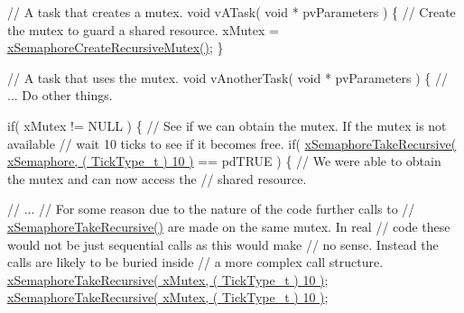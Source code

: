 \begin{DoxyPre}// A task that creates a mutex.
void vATask( void * pvParameters )
\{
   // Create the mutex to guard a shared resource.
   xMutex = \hyperlink{vendor_2ceedling_2plugins_2freertos_2src_2freertos_2include_2semphr_8h_a1bbc843be5a41ea83d2693b2189fc0f8}{xSemaphoreCreateRecursiveMutex()};
\}\end{DoxyPre}



\begin{DoxyPre}// A task that uses the mutex.
void vAnotherTask( void * pvParameters )
\{
   // ... Do other things.\end{DoxyPre}



\begin{DoxyPre}   if( xMutex != NULL )
   \{
       // See if we can obtain the mutex.  If the mutex is not available
       // wait 10 ticks to see if it becomes free.
       if( \hyperlink{vendor_2ceedling_2plugins_2freertos_2src_2freertos_2include_2semphr_8h_ad395f4bba51eea6af3397d72bc079e4d}{xSemaphoreTakeRecursive( xSemaphore, ( TickType\_t ) 10 )} == pdTRUE )
       \{
           // We were able to obtain the mutex and can now access the
           // shared resource.\end{DoxyPre}



\begin{DoxyPre}           // ...
           // For some reason due to the nature of the code further calls to
        // \hyperlink{vendor_2ceedling_2plugins_2freertos_2src_2freertos_2include_2semphr_8h_ad395f4bba51eea6af3397d72bc079e4d}{xSemaphoreTakeRecursive()} are made on the same mutex.  In real
        // code these would not be just sequential calls as this would make
        // no sense.  Instead the calls are likely to be buried inside
        // a more complex call structure.
           \hyperlink{vendor_2ceedling_2plugins_2freertos_2src_2freertos_2include_2semphr_8h_ad395f4bba51eea6af3397d72bc079e4d}{xSemaphoreTakeRecursive( xMutex, ( TickType\_t ) 10 )};
           \hyperlink{vendor_2ceedling_2plugins_2freertos_2src_2freertos_2include_2semphr_8h_ad395f4bba51eea6af3397d72bc079e4d}{xSemaphoreTakeRecursive( xMutex, ( TickType\_t ) 10 )};\end{DoxyPre}



